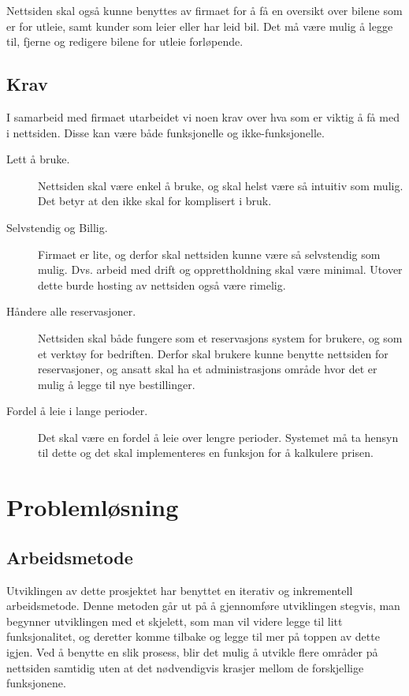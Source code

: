Nettsiden skal også kunne benyttes av firmaet for å få en oversikt over bilene som er for utleie, samt kunder som leier eller har leid bil. Det må være mulig å legge til, fjerne og redigere bilene for utleie forløpende.


\subsection{Krav} \label{kravliste1}
I samarbeid med firmaet utarbeidet vi noen krav over hva som er viktig å få med i nettsiden. Disse kan være både funksjonelle og ikke-funksjonelle.
\begin{description}
\item[Lett å bruke.]Nettsiden skal være enkel å bruke, og skal helst være så intuitiv som mulig. Det betyr at den ikke skal for komplisert i bruk.
\item[Selvstendig og Billig.]Firmaet er lite, og derfor skal nettsiden kunne være så selvstendig som mulig. Dvs. arbeid med drift og opprettholdning skal være minimal. Utover dette burde hosting av nettsiden også være rimelig.
\item[Håndere alle reservasjoner.]Nettsiden skal både fungere som et reservasjons system for brukere, og som et verktøy for bedriften. Derfor skal brukere kunne benytte nettsiden for reservasjoner, og ansatt skal ha et administrasjons område hvor det er mulig å legge til nye bestillinger.
\item[Fordel å leie i lange perioder.]Det skal være en fordel å leie over lengre perioder. Systemet må ta hensyn til dette og det skal implementeres en funksjon for å kalkulere prisen.
\end{description}



\section{Problemløsning}
\subsection{Arbeidsmetode}
Utviklingen av dette prosjektet har benyttet en iterativ og inkrementell arbeidsmetode. Denne metoden går ut på å gjennomføre utviklingen stegvis, man begynner utviklingen med et skjelett, som man vil videre legge til litt funksjonalitet, og deretter komme tilbake og legge til mer på toppen av dette igjen. Ved å benytte en slik prosess, blir det mulig å utvikle flere områder på nettsiden samtidig uten at det nødvendigvis krasjer mellom de forskjellige funksjonene.

